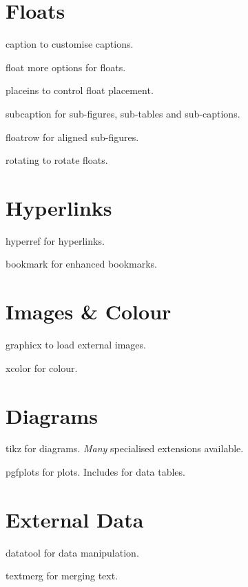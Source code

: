 \documentclass[a4paper,welsh,british,twocolumn]{article}
\begin{document}
\section{Floats}
\begin{pkgdescription}
  \item[caption] to customise captions.
  \item[float] more options for floats.
  \item[placeins] to control float placement.
  \item[subcaption] for sub-figures, sub-tables and sub-captions.
  \item[floatrow] for aligned sub-figures.
  \item[rotating] to rotate floats.
\end{pkgdescription}
\section{Hyperlinks}
\begin{pkgdescription}
  \item[hyperref] for hyperlinks.
  \item[bookmark] for enhanced bookmarks.
\end{pkgdescription}
\section{Images \& Colour}
\begin{pkgdescription}
  \item[graphicx] to load external images.
  \item[xcolor] for colour.
\end{pkgdescription}
\section{Diagrams}
\begin{pkgdescription}
  \item[tikz] for diagrams.
  \emph{Many} specialised extensions available.
  \item[pgfplots] for plots.
  Includes  for data tables.
\end{pkgdescription}
\section{External Data}
\begin{pkgdescription}
  \item[datatool] for data manipulation.
  \item[textmerg] for merging text.
\end{pkgdescription}
\end{document}
